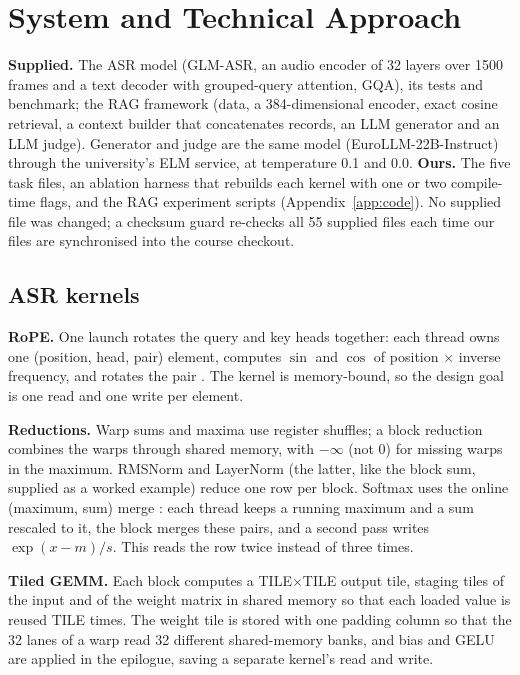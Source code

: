 \documentclass{article}
\begin{document}
\section{System and Technical Approach}
\label{sec:approach}

\textbf{Supplied.} The ASR model (GLM-ASR, an audio encoder of 32 layers over 1500 frames and a text decoder with grouped-query attention, GQA), its tests and benchmark; the RAG framework (data, a 384-dimensional encoder, exact cosine retrieval, a context builder that concatenates records, an LLM generator and an LLM judge). Generator and judge are the same model (EuroLLM-22B-Instruct) through the university's ELM service, at temperature 0.1 and 0.0. \textbf{Ours.} The five task files, an ablation harness that rebuilds each kernel with one or two compile-time flags, and the RAG experiment scripts (Appendix~\ref{app:code}). No supplied file was changed; a checksum guard re-checks all 55 supplied files each time our files are synchronised into the course checkout.

\subsection{ASR kernels}
\textbf{RoPE.} One launch rotates the query and key heads together: each thread owns one (position, head, pair) element, computes $\sin$ and $\cos$ of position $\times$ inverse frequency, and rotates the pair \citep{su2024roformer}. The kernel is memory-bound, so the design goal is one read and one write per element.

\textbf{Reductions.} Warp sums and maxima use register shuffles; a block reduction combines the warps through shared memory, with $-\infty$ (not 0) for missing warps in the maximum. RMSNorm and LayerNorm (the latter, like the block sum, supplied as a worked example) reduce one row per block. Softmax uses the online (maximum, sum) merge \citep{milakov2018online}: each thread keeps a running maximum and a sum rescaled to it, the block merges these pairs, and a second pass writes $\exp(x-m)/s$. This reads the row twice instead of three times.

\textbf{Tiled GEMM.} Each block computes a TILE$\times$TILE output tile, staging tiles of the input and of the weight matrix in shared memory so that each loaded value is reused TILE times. The weight tile is stored with one padding column so that the 32 lanes of a warp read 32 different shared-memory banks, and bias and GELU are applied in the epilogue, saving a separate kernel's read and write.
\end{document}
